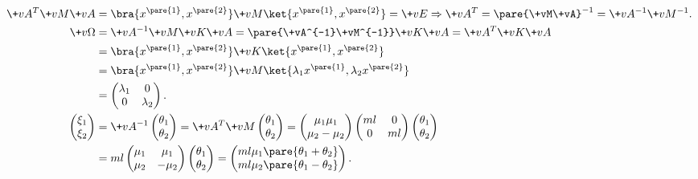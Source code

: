 \documentclass{ctexart}
\begin{document}
\begin{align*}
    \+vA^T \+vM \+vA &= \bra{x^{\pare{1}}, x^{\pare{2}}} \+vM \ket{x^{\pare{1}},x^{\pare{2}}} = \+vE\Rightarrow \+vA^T = \pare{\+vM\+vA}^{-1} = \+vA^{-1}\+vM^{-1}. \\
    \+v\Omega &= \+vA^{-1}\+vM\+vK\+vA = \pare{\+vA^{-1}\+vM^{-1}}\+vK\+vA = \+vA^T \+vK\+vA \\
    &= \bra{x^{\pare{1}}, x^{\pare{2}}} \+vK \ket{x^{\pare{1}},x^{\pare{2}}} \\
    &= \bra{x^{\pare{1}}, x^{\pare{2}}} \+vM \ket{\lambda_1 x^{\pare{1}},\lambda_2 x^{\pare{2}}} \\
    &= \begin{pmatrix}
        \lambda_1 & 0 \\
        0 & \lambda_2
    \end{pmatrix}. \\
    \begin{pmatrix}
        \xi_1 \\ \xi_2
    \end{pmatrix} &= \+vA^{-1}\begin{pmatrix}
        \theta_1 \\ \theta_2
    \end{pmatrix} = \+vA^T \+vM \begin{pmatrix}
        \theta_1 \\ \theta_2
    \end{pmatrix} = \begin{pmatrix}
        \mu_1 \mu_1 \\ \mu_2 -\mu_2
    \end{pmatrix}\begin{pmatrix}
        ml & 0 \\
        0 & ml
    \end{pmatrix}\begin{pmatrix}
        \theta_1 \\ \theta_2
    \end{pmatrix} \\ &= ml \begin{pmatrix}
        \mu_1 & \mu_1 \\
        \mu_2 & -\mu_2
    \end{pmatrix}\begin{pmatrix}
        \theta_1 \\ \theta_2
    \end{pmatrix} = \begin{pmatrix}
        ml\mu_1\pare{\theta_1 + \theta_2} \\
        ml\mu_2\pare{\theta_1 - \theta_2}
    \end{pmatrix}.
\end{align*}
\end{document}
